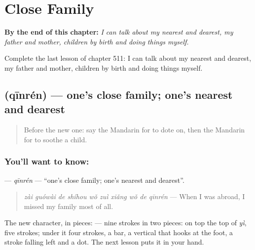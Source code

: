 
\chapter{Close Family}
\label{ch:zh-close-family}

\begin{chapteropening}
\textbf{By the end of this chapter:} \emph{I can talk about my nearest and dearest, my father and mother, children by birth and doing things myself.}

Complete the last lesson of chapter 511: I can talk about my nearest and dearest, my father and mother, children by birth and doing things myself.
\end{chapteropening}

\section[\texorpdfstring{\zh{亲人} (qīnrén)}{亲人 (qīnrén)}]{ (qīnrén) — one's close family; one's nearest and dearest}

\label{lesson:ZH-C511-qinren}



\begin{quote}
Before the new one: say the Mandarin for to dote on, then the Mandarin for to soothe a child.
\end{quote}

\subsection*{You'll want to know: }
\textbf{} — \emph{qīnrén} — \textquotedblleft{}one's close family; one's nearest and dearest\textquotedblright{}.

\begin{quote}
\textbf{} \emph{zài guówài de shíhou wǒ zuì xiǎng wǒ de qīnrén} — When I was abroad, I missed my family most of all.
\end{quote}

The new character, in pieces:  — nine strokes in two pieces: on top the top of  \emph{yì}, five strokes; under it four strokes, a bar, a vertical that hooks at the foot, a stroke falling left and a dot. The next lesson puts it in your hand.

